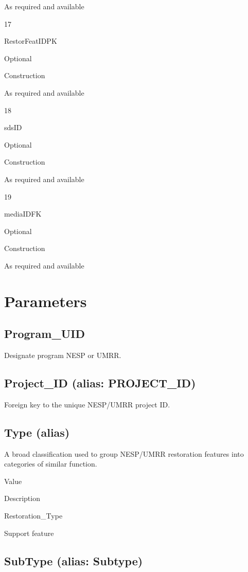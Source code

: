 \documentclass[
  letterpaper,
  DIV=11,
  numbers=noendperiod]{scrreprt}
\begin{document}
As required and available

17

RestorFeatIDPK

Optional

Construction

As required and available

18

sdsID

Optional

Construction

As required and available

19

mediaIDFK

Optional

Construction

As required and available

\section{Parameters}\label{parameters-25}

\subsection{Program\_UID}\label{program_uid-25}

Designate program NESP or UMRR.

\subsection{Project\_ID (alias:
PROJECT\_ID)}\label{project_id-alias-project_id-25}

Foreign key to the unique NESP/UMRR project ID.

\subsection{Type (alias)}\label{type-alias-19}

A broad classification used to group NESP/UMRR restoration features into
categories of similar function.

Value

Description

Restoration\_Type

Support feature

\subsection{SubType (alias: Subtype)}\label{subtype-alias-subtype-25}
\end{document}

